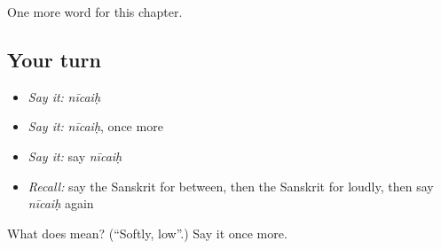 \begin{grammarlens}[title={What you've built}]
One more word for this chapter.
\end{grammarlens}

\subsection*{Your turn}
\begin{itemize}
\raggedright
  \item \emph{Say it:} \emph{nīcaiḥ}
  \item \emph{Say it:} \emph{nīcaiḥ}, once more
  \item \emph{Say it:} say \emph{nīcaiḥ}
  \item \emph{Recall:} say the Sanskrit for between, then the Sanskrit for loudly, then say \emph{nīcaiḥ} again
\end{itemize}

\begin{tcolorbox}[breakable,colback=teal!4,colframe=teal!35!black,title={Before you move on}]
What does  mean? (\textquotedblleft{}Softly, low\textquotedblright{}.) Say it once more.
\end{tcolorbox}
